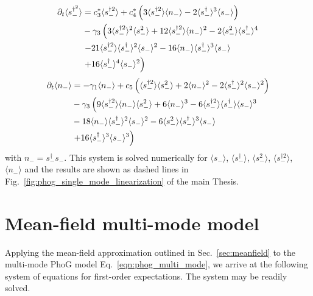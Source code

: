 \begin{align}
%
%
\partial_t\langle s_-^{\dagger^2} \rangle &= c_3^* \langle s_-^{\dagger 2}\rangle + c_4^* \left(3 \langle s_-^{\dagger 2} \rangle \langle n_- \rangle - 2 \langle s_-^\dagger \rangle^3 \langle s_- \rangle \right) \notag \\
%
&- \gamma_3 \left(3 \langle s_-^{\dagger 2} \rangle^2 \langle s_-^2 \rangle + 12 \langle s_-^{\dagger 2} \rangle \langle n_- \rangle^2 - 2\langle s_-^2 \rangle \langle s_-^\dagger \rangle^4 \right. \notag \\
%
&\left. - 21 \langle s_-^{\dagger 2}\rangle \langle s_-^\dagger\rangle^2 \langle s_- \rangle^2 - 16 \langle n_- \rangle \langle s_-^\dagger \rangle^3 \langle s_-\rangle \right. \notag \\
%
& \left.+ 16 \langle s_-^\dagger\rangle^4 \langle s_- \rangle^2 \right)\notag
\end{align}
\begin{align}\label{eqn:expectations_linear_last}
%
%
\partial_t \langle n_- \rangle &= - \gamma_1 \langle n_- \rangle + c_5 \left( \langle s_-^{\dagger 2} \rangle \langle s_-^2 \rangle + 2 \langle n_- \rangle^2 - 2 \langle s_-^\dagger \rangle^2 \langle s_- \rangle^2 \right) \notag \\
%
&- \gamma_3 \left( 9 \langle s_-^{\dagger 2} \rangle \langle n_-  \rangle \langle s_-^2\rangle + 6 \langle n_-\rangle^3  - 6 \langle s_-^{\dagger 2}\rangle \langle s_-^\dagger \rangle \langle s_- \rangle^3 \right. \notag \\
%
& - 18 \langle n_- \rangle \langle s_-^\dagger \rangle^2 \langle s_- \rangle^2 - 6 \langle s_-^2 \rangle \langle s_-^\dagger \rangle^3 \langle s_- \rangle \notag \\
%
& \left. + 16 \langle s_-^\dagger \rangle^3 \langle s_-\rangle^3 \right)
\end{align}
with $n_- = s_-^\dagger s_-$. This system is solved numerically for $\langle s_- \rangle$, $\langle s_-^\dagger \rangle$, $\langle s_-^2\rangle$, $\langle s_-^{\dagger 2}\rangle$, $\langle n_-\rangle$ and the results are shown as dashed lines in Fig.~\ref{fig:phog_single_mode_linearization} of the main Thesis.

\section{Mean-field multi-mode model}\label{appendix:mean_field}
Applying the mean-field approximation outlined in Sec.~\ref{sec:meanfield} to the multi-mode PhoG model Eq.~\ref{eqn:phog_multi_mode}, we arrive at the following system of equations for first-order expectations. The system may be readily solved.

